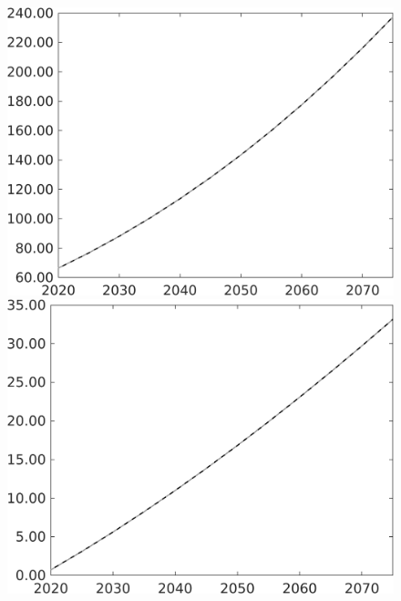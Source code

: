 \documentclass[12pt]{article}
\begin{document}
\begin{figure}[h!!]
\begin{minipage}[]{0.32\textwidth}
	\end{minipage}		
	\begin{minipage}[]{0.32\textwidth}
		\includegraphics[width=1\textwidth]{../../codding_model/own_basedOnFried/optimalPol_010922_revision/figures/all_13Sept22/PerdifNoTauf_regime0_CompTaul_pee_spillover0_nsk1_xgr0_knspil1_sep1_LFlimit0_emsbase0_countec0_GovRev0_etaa0.79_lgd0.png}
	\end{minipage}	
	\begin{minipage}[]{0.32\textwidth}
		\includegraphics[width=1\textwidth]{../../codding_model/own_basedOnFried/optimalPol_010922_revision/figures/all_13Sept22/PerdifNoTauf_regime0_CompTaul_pf_spillover0_nsk1_xgr0_knspil1_sep1_LFlimit0_emsbase0_countec0_GovRev0_etaa0.79_lgd0.png}

\end{minipage}
\end{figure}
\end{document}
